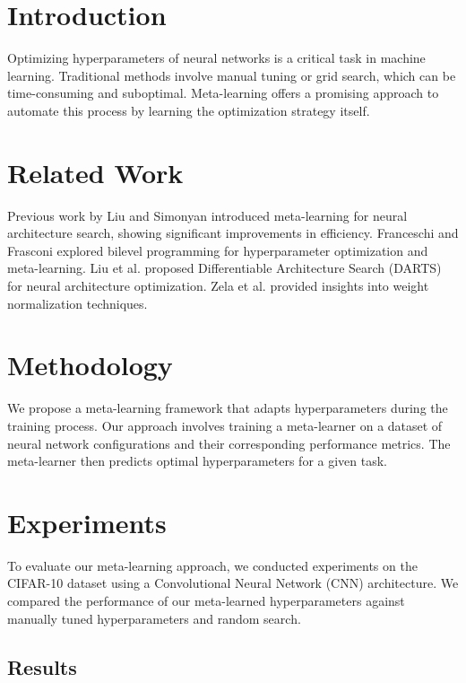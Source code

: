 \section{Introduction}

Optimizing hyperparameters of neural networks is a critical task in machine learning. Traditional methods involve manual tuning or grid search, which can be time-consuming and suboptimal. Meta-learning offers a promising approach to automate this process by learning the optimization strategy itself.

\section{Related Work}

Previous work by Liu and Simonyan \cite{liu2021metahypernet} introduced meta-learning for neural architecture search, showing significant improvements in efficiency. Franceschi and Frasconi \cite{franceschi2018bilevel} explored bilevel programming for hyperparameter optimization and meta-learning. Liu et al. \cite{liu2018darts} proposed Differentiable Architecture Search (DARTS) for neural architecture optimization. Zela et al. \cite{zela2020understanding} provided insights into weight normalization techniques.

\section{Methodology}

We propose a meta-learning framework that adapts hyperparameters during the training process. Our approach involves training a meta-learner on a dataset of neural network configurations and their corresponding performance metrics. The meta-learner then predicts optimal hyperparameters for a given task.

\section{Experiments}

To evaluate our meta-learning approach, we conducted experiments on the CIFAR-10 dataset using a Convolutional Neural Network (CNN) architecture. We compared the performance of our meta-learned hyperparameters against manually tuned hyperparameters and random search.

\subsection{Results}

